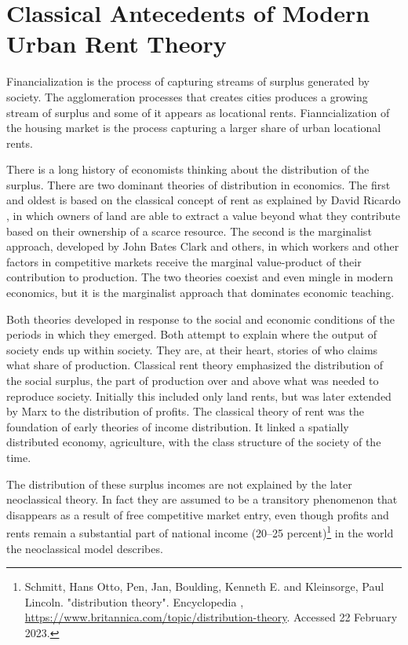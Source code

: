 \chapter{Classical Antecedents of Modern Urban Rent Theory} \label{chapter-rent}

Financialization is the process of capturing streams of surplus generated by society. The agglomeration processes that creates cities produces a growing stream of surplus and some of it appears as locational rents. Fianncialization of the housing market is the process  capturing a larger share of urban locational rents. %

There is a long history of economists thinking about the distribution of the surplus. %
There are two dominant theories of \gls{distribution} in economics. The first and oldest is based on the classical concept of rent as explained  by David Ricardo \cite{ricardoEssayInfluenceLow1815}, in which owners of land are able to extract a value beyond what they contribute based on their ownership of a scarce resource. The second is the marginalist approach, developed by John Bates Clark and others, in which workers and other factors  in competitive markets receive the \gls{marginal value-product} of their contribution to production. The two theories coexist and even mingle in modern economics, but it is the marginalist approach that dominates economic teaching. 

Both theories developed in response to the social and economic conditions of the periods in which they emerged. Both attempt to explain where the output of society ends up within society. They are, at their heart, stories of who %
claims what share of production. Classical rent theory emphasized the distribution of the social \gls{surplus}, the part of production over and above what was needed to reproduce society. Initially this included only land rents, but was later extended by Marx to the distribution of profits.
The classical theory of rent was the foundation of early %
theories of income distribution. It linked a spatially distributed economy, agriculture, with the class structure of the society of the time. 

The distribution of these surplus incomes are not explained by the later neoclassical theory. In fact they are assumed to be a transitory phenomenon that disappears as a result of free competitive market entry, even though profits and rents remain a substantial part of national income (20–25 percent)\footnote{Schmitt, Hans Otto, Pen, Jan, Boulding, Kenneth E. and Kleinsorge, Paul Lincoln. "distribution theory". Encyclopedia \cite{Britannica},  \url{https://www.britannica.com/topic/distribution-theory}. Accessed 22 February 2023.} in the world the neoclassical model describes. %

